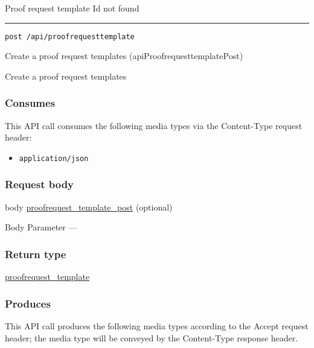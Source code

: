 Proof request template Id not found \protect\hyperlink{}{}

\begin{center}\rule{0.5\linewidth}{\linethickness}\end{center}

\protect\hypertarget{apiProofrequesttemplatePost}{}{}

\begin{verbatim}
post /api/proofrequesttemplate
\end{verbatim}

Create a proof request templates ({apiProofrequesttemplatePost})

Create a proof request templates

\hypertarget{consumes-35}{%
\subsubsection{Consumes}\label{consumes-35}}

This API call consumes the following media types via the {Content-Type}
request header:

\begin{itemize}
\tightlist
\item
  \texttt{application/json}
\end{itemize}

\hypertarget{request-body-35}{%
\subsubsection{Request body}\label{request-body-35}}

body
\protect\hyperlink{proofrequest_template_post}{proofrequest\_template\_post}
(optional)

{Body Parameter} ---

\hypertarget{return-type-83}{%
\subsubsection{Return type}\label{return-type-83}}

\protect\hyperlink{proofrequest_template}{proofrequest\_template}

\hypertarget{produces-105}{%
\subsubsection{Produces}\label{produces-105}}

This API call produces the following media types according to the
{Accept} request header; the media type will be conveyed by the
{Content-Type} response header.

